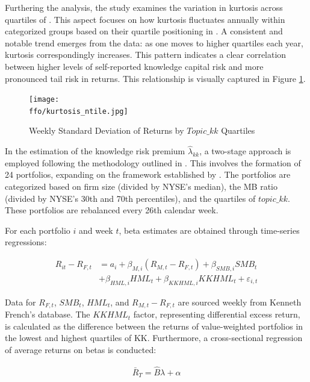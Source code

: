 \documentclass[12pt, letterpaper]{article}
\begin{document}
Furthering the analysis, the study examines the variation in kurtosis across quartiles of \tkk. This aspect focuses on how kurtosis fluctuates annually within categorized groups based on their quartile positioning in \tkk. A consistent and notable trend emerges from the data: as one moves to higher quartiles each year, kurtosis correspondingly increases. This pattern indicates a clear correlation between higher levels of self-reported knowledge capital risk and more pronounced tail risk in returns. This relationship is visually captured in Figure \ref{fig:kurtosis_ntile}.

\begin{figure}[h!]
\centering
\texttt{[image: \\ffo/kurtosis\_ntile.jpg]}
\caption{Weekly Standard Deviation of Returns by $Topic\_{kk}$ Quartiles}
\label{fig:kurtosis_ntile}
\end{figure}

In the estimation of the knowledge risk premium \(\widehat{\lambda}_{kk}\), a two-stage approach is employed following the methodology outlined in \cite{Goyal2012-ct}. This involves the formation of 24 portfolios, expanding on the framework established by \cite{Fama1993-da}. The portfolios are categorized based on firm size (divided by NYSE's median), the MB ratio (divided by NYSE's 30th and 70th percentiles), and the quartiles of \(topic\_kk\). These portfolios are rebalanced every 26th calendar week.

For each portfolio \(i\) and week \(t\), beta estimates are obtained through time-series regressions:

\begin{align*}
    R_{it} - R_{F,t} &= a_i + \beta_{M, i}(R_{M,t} - R_{F,t}) + \beta_{SMB, i} SMB_t \\
    &+ \beta_{HML, i} HML_t + \beta_{KKHML, i} KKHML_t + \varepsilon_{i,t}
\end{align*}

Data for \(R_{F,t}\), \(SMB_t\), \(HML_t\), and \(R_{M,t} - R_{F,t}\) are sourced weekly from Kenneth French's database. The \(KKHML_t\) factor, representing differential excess return, is calculated as the difference between the returns of value-weighted portfolios in the lowest and highest quartiles of KK. Furthermore, a cross-sectional regression of average returns on betas is conducted:

\begin{align}
    \bar{R}_T = \widehat{B} \lambda + \alpha
\end{align}
\end{document}
